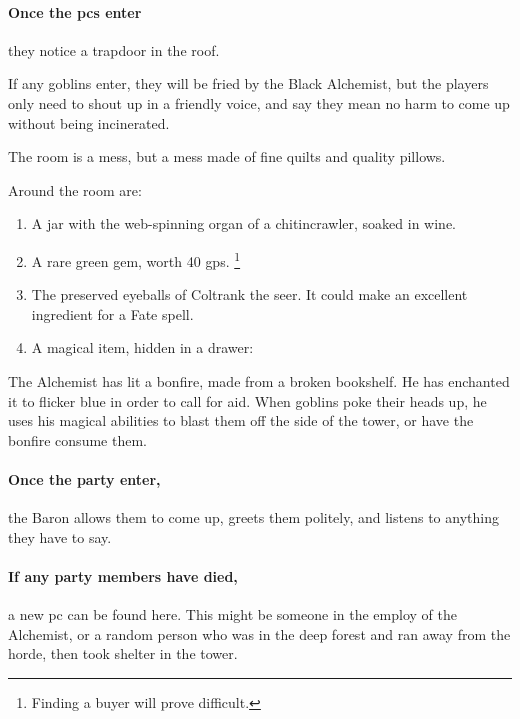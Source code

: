 \begin{multicols}{2}
\paragraph{Once the \glspl{pc} enter}
they notice a trapdoor in the roof.

If any goblins enter, they will be fried by the Black Alchemist, but the players only need to shout up in a friendly voice, and say they mean no harm to come up without being incinerated.


The room is a mess, but a mess made of fine quilts and quality pillows.

Around the room are:

\begin{enumerate}

  \item{A jar with the web-spinning organ of a chitincrawler, soaked in wine.}
  \item{A rare green gem, worth 40 \glspl{gp}.%
  \footnote{Finding a buyer will prove difficult.}}
  \item{The preserved eyeballs of Coltrank the seer.
  It could make an excellent \gls{ingredient} for a Fate spell.}
  \item
  A magical item, hidden in a drawer:

\end{enumerate}

\lootMagic 


\begin{exampletext}
  The Alchemist has lit a bonfire, made from a broken bookshelf.
  He has enchanted it to flicker blue in order to call for aid.
  When goblins poke their heads up, he uses his magical abilities to blast them off the side of the tower, or have the bonfire consume them.
\end{exampletext}

\paragraph{Once the party enter,}
the Baron allows them to come up, greets them politely, and listens to anything they have to say.


\paragraph{If any party members have died,}
a new \gls{pc} can be found here.
This might be someone in the employ of the Alchemist, or a random person who was in the deep forest and ran away from the horde, then took shelter in the tower.


\end{multicols}
